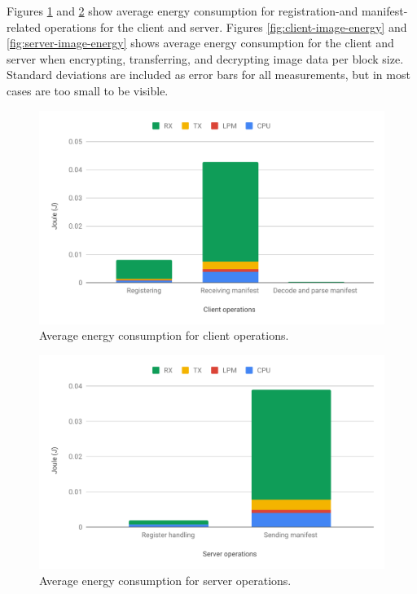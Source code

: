 \documentclass[0-thesis.tex]{subfiles}
\begin{document}
Figures \ref{fig:client-operations-energy} and \ref{fig:server-operations-energy} show
average energy consumption for registration-and manifest-related operations for the client
and server. Figures \ref{fig:client-image-energy} and \ref{fig:server-image-energy} shows
average energy consumption for the client and server when encrypting, transferring, and
decrypting image data per block size. Standard deviations are included as error bars for
all measurements, but in most cases are too small to be visible.

\begin{figure}[]
    \caption{Average energy consumption for client operations.}
    \label{fig:client-operations-energy}
    \includegraphics[scale=0.77]{images/client-operations-energy.pdf}
\end{figure}

\begin{figure}[]
    \caption{Average energy consumption for server operations.}
    \label{fig:server-operations-energy}
    \includegraphics[scale=0.77]{images/server-operations-energy.pdf}
\end{figure}
\end{document}

